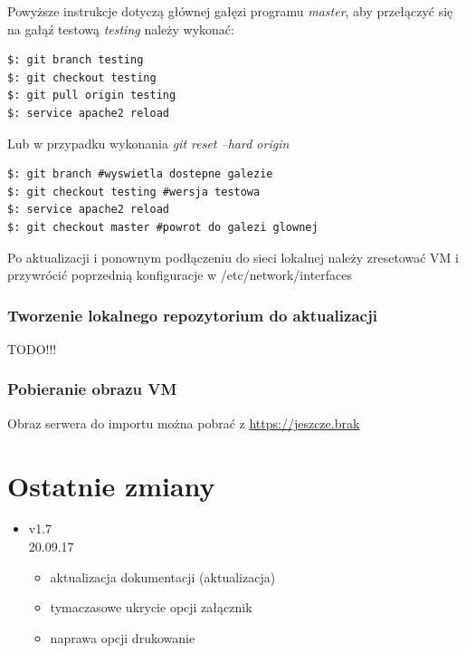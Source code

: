 \documentclass[12pt,a4paper]{article}
\begin{document}
Powyższe instrukcje dotyczą głównej gałęzi programu \textit{master}, aby przełączyć się na gałąź testową \textit{testing} należy wykonać:
\begin{lstlisting}
$: git branch testing
$: git checkout testing
$: git pull origin testing
$: service apache2 reload
\end{lstlisting}
Lub w przypadku wykonania \textit{git reset --hard origin}
\begin{lstlisting}
$: git branch #wyswietla dostepne galezie
$: git checkout testing #wersja testowa
$: service apache2 reload
$: git checkout master #powrot do galezi glownej
\end{lstlisting}
Po aktualizacji i ponownym podłączeniu do sieci lokalnej należy zresetować VM i przywrócić poprzednią konfiguracje w /etc/network/interfaces
\subsubsection{Tworzenie lokalnego repozytorium do aktualizacji}
\begin{center}
TODO!!!
\end{center}
\subsubsection{Pobieranie obrazu VM}
Obraz serwera do importu można pobrać z \url{https://jeszcze.brak}

\newpage
\section{Ostatnie zmiany}
\begin{itemize}
\item v1.7\\ 
20.09.17
\begin{itemize}
\item aktualizacja dokumentacji (aktualizacja)
\item tymaczasowe ukrycie opcji załącznik
\item naprawa opcji drukowanie
\end{itemize}
\end{itemize}
\end{document}
